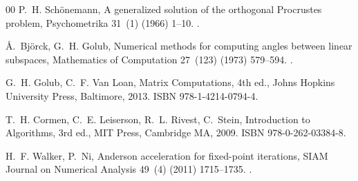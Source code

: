 \documentclass[a4paper,12pt]{report}
\begin{document}
\begin{thebibliography}{00}
P.~H. Sch\"{o}nemann,
  A generalized solution of the orthogonal Procrustes problem,
  Psychometrika 31~(1) (1966) 1--10.
\newblock \href{https://doi.org/10.1007/BF02289451}
  {}.

\r{A}.~Bj\"{o}rck, G.~H. Golub,
  Numerical methods for computing angles between linear subspaces,
  Mathematics of Computation 27~(123) (1973) 579--594.
\newblock \href{https://doi.org/10.1090/S0025-5718-1973-0348991-3}
  {}.

G.~H. Golub, C.~F. Van Loan,
  Matrix Computations, 4th ed.,
  Johns Hopkins University Press, Baltimore, 2013.
  ISBN 978-1-4214-0794-4.

T.~H. Cormen, C.~E. Leiserson, R.~L. Rivest, C.~Stein,
  Introduction to Algorithms, 3rd ed.,
  MIT Press, Cambridge MA, 2009.
  ISBN 978-0-262-03384-8.

H.~F. Walker, P.~Ni,
  Anderson acceleration for fixed-point iterations,
  SIAM Journal on Numerical Analysis 49~(4) (2011) 1715--1735.
\newblock \href{https://doi.org/10.1137/10078356X}
  {}.


\end{thebibliography}
\end{document}
